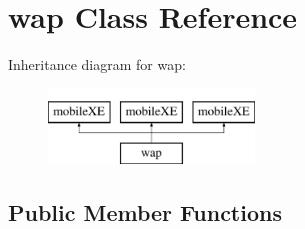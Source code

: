 \hypertarget{classwap}{\section{wap Class Reference}
\label{classwap}
}
Inheritance diagram for wap\-:\begin{figure}[H]
\begin{center}
\leavevmode
\includegraphics[height=2.000000cm]{classwap}
\end{center}
\end{figure}
\subsection*{Public Member Functions}
